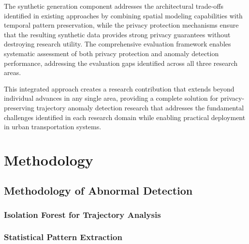 \documentclass[runningheads]{llncs}
\begin{document}
The synthetic generation component addresses the architectural trade-offs identified in existing approaches by combining spatial modeling capabilities with temporal pattern preservation, while the privacy protection mechanisms ensure that the resulting synthetic data provides strong privacy guarantees without destroying research utility. The comprehensive evaluation framework enables systematic assessment of both privacy protection and anomaly detection performance, addressing the evaluation gaps identified across all three research areas.

This integrated approach creates a research contribution that extends beyond individual advances in any single area, providing a complete solution for privacy-preserving trajectory anomaly detection research that addresses the fundamental challenges identified in each research domain while enabling practical deployment in urban transportation systems.

\section{Methodology}
\label{sec:methodology}

\subsection{Methodology of Abnormal Detection}
\label{sec:abnormal-detection}

\subsubsection{Isolation Forest for Trajectory Analysis}
\label{sec:iso}

\begin{compactoutline}
\end{compactoutline}

\subsubsection{Statistical Pattern Extraction}
\label{sec:pattern-extraction}
\end{document}
